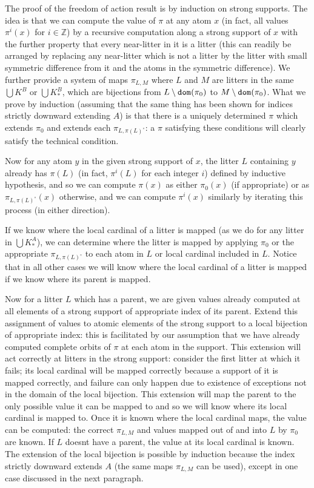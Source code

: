 \documentclass[12pt]{article}
\begin{document}
The proof of the freedom of action result is by induction on strong supports.  The idea is that we can compute the value of $\pi$ at any atom $x$ (in fact, all values $\pi^i(x)$ for $i \in \mathbb Z$) by a recursive computation along a strong support of $x$ with the further property that every near-litter in it is a litter (this can readily be arranged by replacing any near-litter which is not a litter by the litter with small symmetric difference from it and the atoms in the symmetric difference).   We further provide a system of maps $\pi_{L,M}$ where $L$ and $M$ are litters in the same $\bigcup K^B$ or $\bigcup K_*^B$, which
are bijections from $L \setminus {\tt dom}(\pi_0)$ to $M \setminus {\tt dom}(\pi_0)$.  What we prove by induction (assuming that the same thing has been shown for indices
strictly downward extending $A$) is that there is a uniquely determined $\pi$ which extends $\pi_0$ and extends each $\pi_{L,\pi(L)^{\circ}}$:  a $\pi$ satisfying these conditions will clearly satisfy the technical condition.

Now for any atom $y$ in the given strong support of $x$, the litter $L$ containing $y$ already has $\pi(L)$ (in fact, $\pi^i(L)$ for each integer $i$) defined by inductive hypothesis, and so we can compute $\pi(x)$ as
either $\pi_0(x)$ (if appropriate) or as $\pi_{L,\pi(L)^{\circ}}(x)$ otherwise, and we can compute $\pi^i(x)$ similarly by iterating this process (in either direction).

If we know where the local cardinal of a litter is mapped (as we do for any litter in $\bigcup K^A_*$), we can determine where the litter is mapped by applying $\pi_0$ or the appropriate $\pi_{L,\pi(L)^{\circ}}$ to each atom in $L$ or local cardinal included in $L$.  Notice that in all other cases we will know where the local cardinal of a litter is mapped if we know where its parent is mapped.


Now for a litter $L$ which has a parent, we are given values already computed at all elements of a strong support of appropriate index of its parent.  Extend this assignment of values to atomic elements of the strong support
to a local bijection of appropriate index:  this is facilitated by our assumption that we have already computed complete orbits of $\pi$ at each atom in the support.  This extension will act correctly at litters in the strong support:  consider the first litter at which it fails;  its local cardinal will be mapped correctly because a support of it is mapped correctly, and failure can only happen due to existence of exceptions not in the domain of the local bijection.  This extension will map the parent to the only possible value it can be mapped to and so we will know where its local cardinal is mapped to.  Once it is known where the local cardinal maps, the value can be computed:  the correct $\pi_{L,M}$ and values mapped out of and into $L$ by $\pi_0$ are known.  If $L$ doesnt have a parent, the value at its local cardinal is known.  The extension of the local bijection is possible by induction because
the index strictly downward extends $A$ (the same maps $\pi_{L,M}$ can be used), except in one case discussed in the next paragraph.
\end{document}
